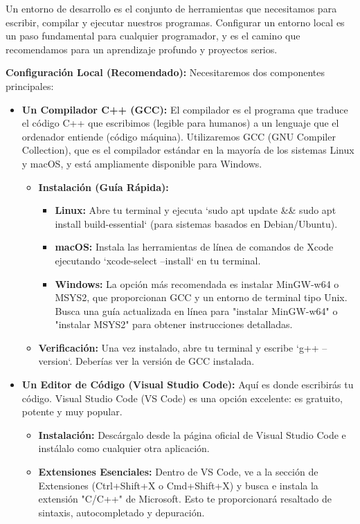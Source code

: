 Un entorno de desarrollo es el conjunto de herramientas que necesitamos para escribir, compilar y ejecutar nuestros programas. Configurar un entorno local es un paso fundamental para cualquier programador, y es el camino que recomendamos para un aprendizaje profundo y proyectos serios.

\textbf{Configuración Local (Recomendado):}
Necesitaremos dos componentes principales:
\begin{itemize}
    \item \textbf{Un Compilador C++ (GCC):} El compilador es el programa que traduce el código C++ que escribimos (legible para humanos) a un lenguaje que el ordenador entiende (código máquina). Utilizaremos GCC (GNU Compiler Collection), que es el compilador estándar en la mayoría de los sistemas Linux y macOS, y está ampliamente disponible para Windows.
        \begin{itemize}
            \item \textbf{Instalación (Guía Rápida):}
                \begin{itemize}
                    \item \textbf{Linux:} Abre tu terminal y ejecuta `sudo apt update && sudo apt install build-essential` (para sistemas basados en Debian/Ubuntu).
                    \item \textbf{macOS:} Instala las herramientas de línea de comandos de Xcode ejecutando `xcode-select --install` en tu terminal.
                    \item \textbf{Windows:} La opción más recomendada es instalar MinGW-w64 o MSYS2, que proporcionan GCC y un entorno de terminal tipo Unix. Busca una guía actualizada en línea para "instalar MinGW-w64" o "instalar MSYS2" para obtener instrucciones detalladas.
                \end{itemize}
            \item \textbf{Verificación:} Una vez instalado, abre tu terminal y escribe `g++ --version`. Deberías ver la versión de GCC instalada.
        \end{itemize}
    \item \textbf{Un Editor de Código (Visual Studio Code):} Aquí es donde escribirás tu código. Visual Studio Code (VS Code) es una opción excelente: es gratuito, potente y muy popular.
        \begin{itemize}
            \item \textbf{Instalación:} Descárgalo desde la página oficial de Visual Studio Code e instálalo como cualquier otra aplicación.
            \item \textbf{Extensiones Esenciales:} Dentro de VS Code, ve a la sección de Extensiones (Ctrl+Shift+X o Cmd+Shift+X) y busca e instala la extensión "C/C++" de Microsoft. Esto te proporcionará resaltado de sintaxis, autocompletado y depuración.
        \end{itemize}
\end{itemize}

